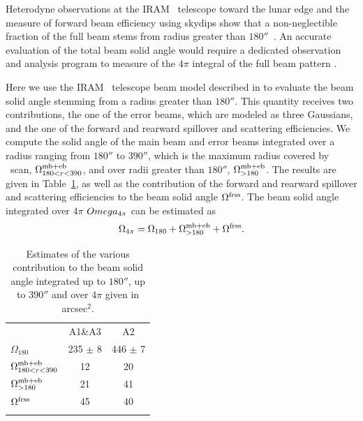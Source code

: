Heterodyne observations at the IRAM \trentemetre\ telescope
toward the lunar edge and the measure of forward beam efficiency using
skydips show that a non-neglectible fraction of the full beam stems
from radius greater than $180''$~\citep{Greve1998, Kramer2013}.
An accurate evaluation of the total beam solid angle would require a
dedicated observation {\lp and analysis} program to measure of the $4\pi$ integral of the
full beam pattern \citep{Greve1998, Sugimoto2004, Gusten2006}.
{\lp Here we use the IRAM \trentemetre\ telescope beam model described
in \citet{Kramer2013} to evaluate the beam solid angle stemming from a
radius greater than $180''$.
This quantity receives two contributions, the one of the error beams,
which are modeled as three Gaussians, and the one of the forward and
rearward spillover and scattering efficiencies. We compute the solid
angle of the main beam and error beams integrated over a radius ranging
from $180''$ to $390''$, which is the maximum radius covered by \bm\ scan,
$\Omega_{180<r<390}^{\rm{mb+eb}}$, and over radii greater
than $180''$, $\Omega_{>180}^{\rm{mb+eb}}$. The results are given in
Table~\ref{tab:solid_corr}, as well as the contribution of the forward and
rearward spillover and scattering efficiencies to the beam solid angle
$\Omega^{\rm{frss}}$. The beam solid angle integrated over $4\pi$
$Omega_{\rm{4\pi}}$ can be estimated as
\begin{equation}
\Omega_{\rm{4\pi}} = \Omega_{180} + \Omega_{>180}^{\rm{mb+eb}}
+ \Omega^{\rm{frss}}.
\label{eq:omega_beam_4pi}
\end{equation}

\begin{table}[!h]
\caption{Estimates of the various contribution to the beam solid angle
integrated up to $180''$, up to $390''$ and over $4\pi$ given in
arcsec$^{2}$. }
\label{tab:solid_corr}
\centering
\begin{tabular}{lcc}
\hline\hline
\noalign{\smallskip}
&  A1\&A3 & A2 \\
\noalign{\smallskip}
\hline
\noalign{\smallskip}
$\Omega_{180}$                  &   235 $\pm$  8 & 446 $\pm$  7 \\\noalign{\smallskip}
$\Omega_{180<r<390}^{\rm{mb+eb}}$  &   12          &   20       \\\noalign{\smallskip}
$\Omega_{>180}^{\rm{mb+eb}}$      &   21          &   41      \\\noalign{\smallskip}
$\Omega^{\rm{frss}}$             &   45          &   40      \\
\noalign{\smallskip}
\hline
\end{tabular}
\end{table}
}

